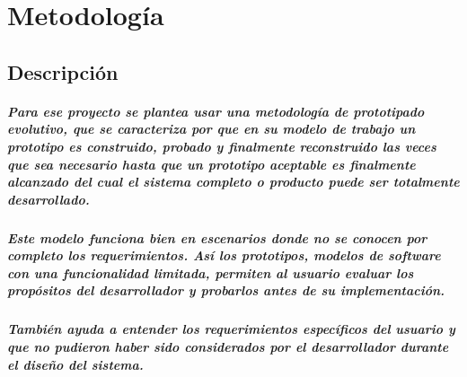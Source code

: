 \clearpage
\chapter{Metodología}
\section{Descripción}
  \paragraph{Para ese proyecto se plantea usar una metodología de prototipado evolutivo, que se caracteriza por que en su modelo de trabajo un prototipo es construido, probado y finalmente reconstruido las veces que sea necesario hasta que un prototipo aceptable es finalmente alcanzado del cual el sistema completo o producto puede ser totalmente desarrollado.}

  \paragraph{Este modelo funciona bien en escenarios donde no se conocen por completo los requerimientos. Así los prototipos, modelos de software con una funcionalidad limitada, permiten al usuario evaluar los propósitos del desarrollador y probarlos antes de su implementación.}
  \paragraph{También ayuda a entender los requerimientos específicos del usuario y que no pudieron haber sido considerados por el desarrollador durante el diseño del sistema.}

